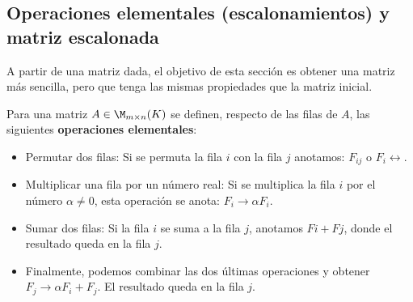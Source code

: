 \subsection{Operaciones elementales (escalonamientos) y matriz escalonada}

A partir de una matriz dada, el objetivo de esta secci\'on es obtener una matriz m\'as sencilla, pero que tenga las mismas propiedades que la matriz inicial.


Para una matriz $ A \in \M_{m\times n} (K)$ se definen, respecto de las filas de $A$, las siguientes \textbf{operaciones elementales}:
\begin{itemize}
    \item Permutar dos filas: Si se permuta la fila $i$ con la fila $j$ anotamos: $F_{i j}$ o $F_i\longleftrightarrow$.
    \item Multiplicar una fila por un número real: Si se multiplica la fila $i$ por el número $\alpha \neq 0$, esta operación
se anota: $F_i\longrightarrow\alpha  F_i$.
    \item Sumar dos filas: Si la fila $i$ se suma a la fila $j$, anotamos $F i + F j$, donde el resultado queda en la fila $j$.
    \item Finalmente, podemos combinar las dos últimas operaciones y obtener $F_j\longrightarrow \alpha  F_i + F_j$. El resultado queda en la fila $j$.
\end{itemize}

